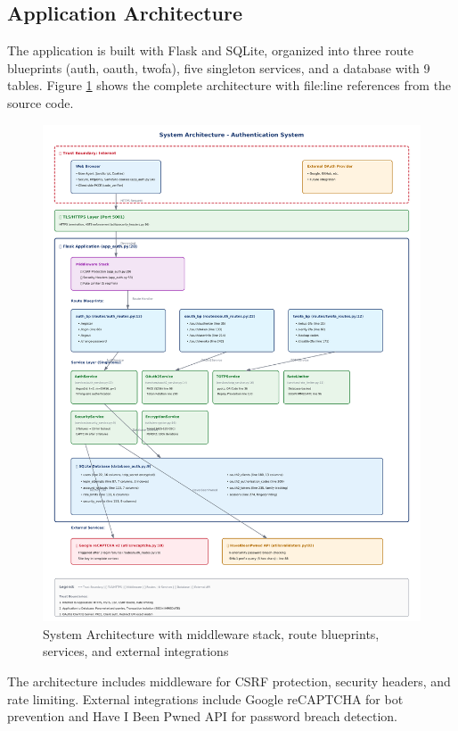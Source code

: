 \documentclass[12pt,a4paper]{article}
\begin{document}
\subsection{Application Architecture}

The application is built with Flask and SQLite, organized into three route blueprints (auth, oauth, twofa), five singleton services, and a database with 9 tables. Figure \ref{fig:architecture} shows the complete architecture with file:line references from the source code.

\begin{figure}[H]
    \centering
    \includegraphics[width=\textwidth]{diagrams/1_system_architecture.pdf}
    \caption{System Architecture with middleware stack, route blueprints, services, and external integrations}
    \label{fig:architecture}
\end{figure}

The architecture includes middleware for CSRF protection, security headers, and rate limiting. External integrations include Google reCAPTCHA for bot prevention and Have I Been Pwned API for password breach detection.
\end{document}
